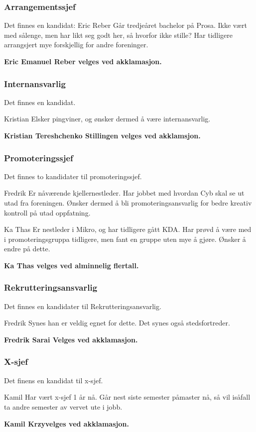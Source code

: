 \documentclass[10pt,norsk,a4paper,usenames,dvipsnames]{article}
\begin{document}
\begin{multicols}
        \subsubsection{Arrangementssjef}
        Det finnes en kandidat:
        Eric Reber
        Går tredjeåret bachelor på Prosa. Ikke vært med sålenge, men har likt seg godt her, så hvorfor ikke stille? Har tidligere arrangsjert mye forskjellig for andre foreninger.

        \textbf{Eric Emanuel Reber velges ved akklamasjon.}

        \subsubsection{Internansvarlig}
        Det finnes en kandidat.

        Kristian
        Elsker pingviner, og ønsker dermed å være internansvarlig.

        \textbf{Kristian Tereshchenko Stillingen velges ved akklamsjon.}

        \subsubsection{Promoteringssjef}
        Det finnes to kandidater til promoteringssjef.

        Fredrik
        Er nåværende kjellernestleder. Har jobbet med hvordan Cyb skal se ut utad fra foreningen. Ønsker dermed å bli promoteringsansvarlig for bedre kreativ kontroll på utad oppfatning.

        Ka Thas
        Er nestleder i Mikro, og har tidligere gått KDA. Har prøvd å være med i promoteringsgruppa tidligere, men fant en gruppe uten mye å gjøre. Ønsker å endre på dette.

        \textbf{Ka Thas velges ved alminnelig flertall.}

        \subsubsection{Rekrutteringsansvarlig}
        Det finnes en kandidater til Rekrutteringsansvarlig.

        Fredrik
        Synes han er veldig egnet for dette. Det synes også stedsfortreder.

        \textbf{Fredrik Sarai Velges ved akklamasjon.}


        \subsubsection{X-sjef}
        Det finens en kandidat til x-sjef.

        Kamil
        Har vært x-sjef 1 år nå. Går nest siste semester påmaster nå, så vil isåfall ta andre semester av vervet ute i jobb.

        \textbf{Kamil Krzy velges ved akklamasjon.}


\end{multicols}
\end{document}

